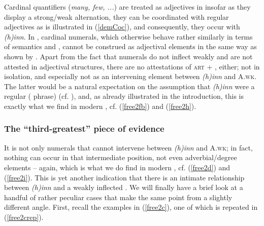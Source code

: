 \documentclass[output=paper,colorlinks,citecolor=brown]{langscibook}
\begin{document}
Cardinal  quantifiers (\textit{many, few, ...}) are treated as adjectives in  insofar as they display a strong/weak alternation, they can be coordinated with regular adjectives  as is  illustrated in  (\ref{demCoc}), and consequently, they occur with \textit{(h)inn}. In , cardinal  numerals, which otherwise behave rather similarly in terms of semantics and , cannot be construed as adjectival elements in the same way as shown by \citet[192--193]{Pfaff2019}. Apart from the fact that numerals do not inflect weakly and are not attested in adjectival  structures, there are no attestations of \textsc{art} + , either;  %
not in isolation, and especially not as an intervening element between \textit{(h)inn} and A.\textsc{wk}. The latter would be a natural expectation on the assumption that \textit{(h)inn} were a regular ( phrase)   (cf.  \citealt{Cinque2005U20}), and, as already illustrated in the introduction, this is exactly what we find in modern , cf. (\ref{free2fb}) and (\ref{free2h}). 
  


\subsubsection{The ``third-greatest'' piece of evidence }
\label{sec:9:mest}

It is not only numerals that cannot intervene between \textit{(h)inn} and A.\textsc{wk}; in fact, nothing can occur in that intermediate position, not even adverbial/degree elements -- again, which is what we do find in modern , cf. (\ref{free2d}) and (\ref{free2i}). This is yet another indication that there is an intimate relationship between \textit{(h)inn} and a weakly inflected . We will finally have a brief look at a handful of rather peculiar cases that make the same point from a slightly different angle. First, recall the examples in (\ref{free2c}), one of which is repeated in (\ref{free2crep}).
\end{document}
